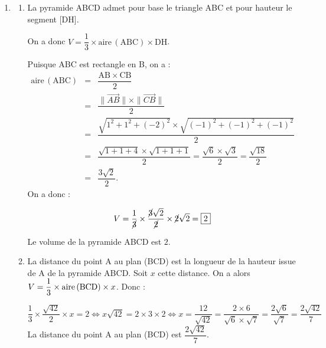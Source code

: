 \documentclass[10pt]{article}
\providecommand{\vect}[1]{\overrightarrow{#1}}
\begin{document}
\begin{enumerate}
\begin{enumerate}
\[\boxed{\mathrm{H}\,(7~;~-1~;~1)}\]

		\item \quad $\mathrm{DH} = \sqrt{(7-5)^2 + (-1-1)^2 + (1 - 1)^2} = \sqrt{2^2 + (-2)^2 + 0^2} = \sqrt{4+4} = \sqrt{8} = \boxed{2\sqrt{2}}$
	\end{enumerate}

\item
	\begin{enumerate}
		\item La pyramide ABCD admet pour base le triangle ABC et pour hauteur le segment [DH].
		
		On a donc $V = \dfrac{1}{3} \times \text{aire}\,(\mathrm{ABC}) \times \mathrm{DH}$.

Puisque ABC est rectangle en B, on a :
\begin{eqnarray*}
\text{aire}\,(\text{ABC}) &=& \dfrac{\mathrm{AB}\times\mathrm{CB}}{2} \\
&=& \dfrac{\|\vect{AB}\| \times \|\vect{CB}\|}{2}\\
&=& \dfrac{\sqrt{1^2 + 1^2 + (-2)^2} \times \sqrt{(-1)^2 + (-1)^2 + (-1)^2}}{2}\\
&=& \dfrac{\sqrt{1+1+4}\times\sqrt{1+1+1}}{2} = \dfrac{\sqrt{6}\times\sqrt{3}}{2} = \dfrac{\sqrt{18}}{2}\\
&=& \dfrac{3\sqrt{2}}{2}.
\end{eqnarray*}
On a donc :

\[V = \dfrac{1}{\cancel{3}} \times \dfrac{\cancel{3}\sqrt{2}}{\cancel{2}} \times \cancel{2}\sqrt{2} = \boxed{2}\]

Le volume de la pyramide ABCD est $2$.
		\item La distance du point A au plan (BCD) est la longueur de la hauteur issue de A de la pyramide ABCD. Soit $x$ cette distance. On a alors $V = \dfrac{1}{3} \times \text{aire\,(BCD)} \times x$. Donc :

\[\dfrac{1}{3} \times \dfrac{\sqrt{42}}{2} \times x = 2 \iff x\sqrt{42} = 2 \times 3 \times 2 \iff x = \dfrac{12}{\sqrt{42}} = \dfrac{2\times6}{\sqrt{6} \times \sqrt{7}} = \dfrac{2\sqrt{6}}{\sqrt{7}} = \boxed{\dfrac{2\sqrt{42}}{7}}\]
La distance du point A au plan (BCD) est $\dfrac{2\sqrt{42}}{7}$.
	\end{enumerate}
\end{enumerate}


\bigskip
\end{document}

